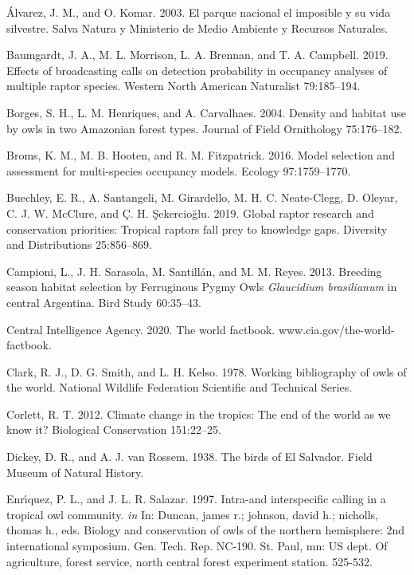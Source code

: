 \documentclass[
]{article}
\begin{document}
\leavevmode\hypertarget{ref-Alvarez:2003}{}%
Álvarez, J. M., and O. Komar. 2003. El parque nacional el imposible y su
vida silvestre. Salva Natura y Ministerio de Medio Ambiente y Recursos
Naturales.

\leavevmode\hypertarget{ref-Baumgardt:2019}{}%
Baumgardt, J. A., M. L. Morrison, L. A. Brennan, and T. A. Campbell.
2019. Effects of broadcasting calls on detection probability in
occupancy analyses of multiple raptor species. Western North American
Naturalist 79:185--194.

\leavevmode\hypertarget{ref-Borges:2004}{}%
Borges, S. H., L. M. Henriques, and A. Carvalhaes. 2004. Density and
habitat use by owls in two Amazonian forest types. Journal of Field
Ornithology 75:176--182.

\leavevmode\hypertarget{ref-Broms:2016}{}%
Broms, K. M., M. B. Hooten, and R. M. Fitzpatrick. 2016. Model selection
and assessment for multi-species occupancy models. Ecology
97:1759--1770.

\leavevmode\hypertarget{ref-Buechley:2019}{}%
Buechley, E. R., A. Santangeli, M. Girardello, M. H. C. Neate-Clegg, D.
Oleyar, C. J. W. McClure, and Ç. H. Şekercioğlu. 2019. Global raptor
research and conservation priorities: Tropical raptors fall prey to
knowledge gaps. Diversity and Distributions 25:856--869.

\leavevmode\hypertarget{ref-Campioni:2013}{}%
Campioni, L., J. H. Sarasola, M. Santillán, and M. M. Reyes. 2013.
Breeding season habitat selection by Ferruginous Pygmy Owls
\emph{Glaucidium brasilianum} in central Argentina. Bird Study
60:35--43.

\leavevmode\hypertarget{ref-CIA:2020}{}%
Central Intelligence Agency. 2020. The world factbook.
www.cia.gov/the-world-factbook.

\leavevmode\hypertarget{ref-Clark:1978}{}%
Clark, R. J., D. G. Smith, and L. H. Kelso. 1978. Working bibliography
of owls of the world. National Wildlife Federation Scientific and
Technical Series.

\leavevmode\hypertarget{ref-Corlett:2012}{}%
Corlett, R. T. 2012. Climate change in the tropics: The end of the world
as we know it? Biological Conservation 151:22--25.

\leavevmode\hypertarget{ref-Dickey:1938}{}%
Dickey, D. R., and A. J. van Rossem. 1938. The birds of El Salvador.
Field Museum of Natural History.

\leavevmode\hypertarget{ref-Enriquez:1997}{}%
Enrı́quez, P. L., and J. L. R. Salazar. 1997. Intra-and interspecific
calling in a tropical owl community. \emph{in} In: Duncan, james r.;
johnson, david h.; nicholls, thomas h., eds. Biology and conservation of
owls of the northern hemisphere: 2nd international symposium. Gen. Tech.
Rep. NC-190. St. Paul, mn: US dept. Of agriculture, forest service,
north central forest experiment station. 525-532.
\end{document}
